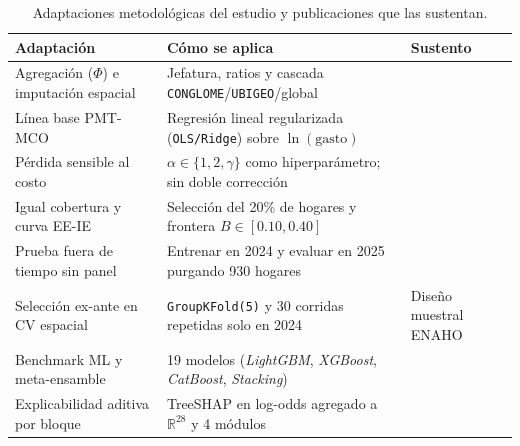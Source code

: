 \begin{table}[htbp]
\centering
\caption{Adaptaciones metodológicas del estudio y publicaciones que las sustentan.}
\label{tab:adaptaciones}
\fontsize{6.8}{8.2}\selectfont
\setlength{\tabcolsep}{3pt}
\begin{tabular}{L{2.5cm}L{3.1cm}L{1.4cm}}
\toprule
\textbf{Adaptación} & \textbf{Cómo se aplica} & \textbf{Sustento} \\
\midrule
Agregación ($\Phi$) e imputación espacial & Jefatura, ratios y cascada \texttt{CONGLOME}/\texttt{UBIGEO}/global & \cite{grosh2022revisiting} \\
\addlinespace[2pt]
Línea base PMT-MCO & Regresión lineal regularizada (\texttt{OLS/Ridge}) sobre $\ln(\text{gasto})$ & \cite{brown2018poor,mcbride2018retooling} \\
\addlinespace[2pt]
Pérdida sensible al costo & $\alpha \in \{1, 2, \gamma\}$ como hiperparámetro; sin doble corrección & \cite{elkan2001foundations} \\
\addlinespace[2pt]
Igual cobertura y curva EE-IE & Selección del 20\% de hogares y frontera $B \in [0.10, 0.40]$ & \cite{noriega2020algorithmic} \\
\addlinespace[2pt]
Prueba fuera de tiempo sin panel & Entrenar en 2024 y evaluar en 2025 purgando 930 hogares & \cite{aiken2023moving} \\
\addlinespace[2pt]
Selección ex-ante en CV espacial & \texttt{GroupKFold(5)} y 30 corridas repetidas solo en 2024 & Diseño muestral ENAHO \\
\addlinespace[2pt]
Benchmark ML y meta-ensamble & 19 modelos (\textit{LightGBM}, \textit{XGBoost}, \textit{CatBoost}, \textit{Stacking}) & \cite{ke2017lightgbm,chen2016xgboost,prokhorenkova2018catboost,wolpert1992stacked,pedregosa2011scikit} \\
\addlinespace[2pt]
Explicabilidad aditiva por bloque & TreeSHAP en log-odds agregado a $\mathbb{R}^{28}$ y 4 módulos & \cite{lundberg2020local} \\
\bottomrule
\end{tabular}
\end{table}
